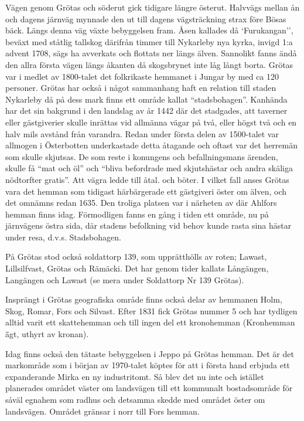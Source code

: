 Vägen genom Grötas och söderut gick tidigare längre österut. Halvvägs mellan ån och dagens järnväg mynnade den ut till dagens vägsträckning strax före Bösas bäck. Längs denna väg växte bebyggelsen fram. Åsen kallades då `Furukangan'', beväxt med ståtlig tallskog därifrån timmer till Nykarleby nya kyrka, invigd 1:a advent 1708, sägs ha avverkats och flottats ner längs älven. Sannolikt fanns ändå den allra första vägen längs åkanten då skogsbrynet inte låg långt borta. Grötas var i medlet av 1800-talet det folkrikaste hemmanet i Jungar by med ca 120 personer. Grötas har också i något sammanhang haft en relation till staden Nykarleby då på dess mark finns ett område kallat ``stadsbohagen''. Kanhända har det sin bakgrund i den landslag av år 1442 där det stadgades, att taverner eller gästgiverier skulle inrättas vid allmänna vägar på två, eller högst två och en halv mils avstånd från varandra. Redan under första delen av 1500-talet var allmogen i Österbotten underkastade detta åtagande och oftast var det herremän som skulle skjutsas. De som reste i konungens och befallningsmans ärenden, skulle få ``mat och öl'' och ``bliva befordrade med skjutshästar och andra skäliga nödtorfter gratis''. Att vägra ledde till åtal. och böter.  I vilket fall anses Grötas vara det hemman som tidigast härbärgerade ett gästgiveri öster om älven, och det omnämns redan 1635. Den troliga platsen var i närheten av där Ahlfors hemman finns idag. Förmodligen fanns en gång i tiden ett område, nu på järnvägens östra sida, där stadens befolkning vid behov kunde rasta sina hästar under resa, d.v.s. Stadsbohagen.

På Grötas stod också soldattorp 139, som upprätthölls av roten; Lawast, Lillsilfvast, Grötas och Rämäcki. Det har genom tider kallats Långängen, Langängen och Lawast (se mera under Soldattorp Nr 139 Grötas).

Insprängt i Grötas geografiska område finns också delar av hemmanen Holm, Skog, Romar, Fors och  Silvast. Efter 1831 fick Grötas nummer 5 och har tydligen alltid varit ett skattehemman och till ingen del ett kronohemman (Kronhemman \= ägt, uthyrt av kronan).

Idag finns också den tätaste bebyggelsen i Jeppo på Grötas hemman. Det är det  markområde som i början av 1970-talet köptes för att i första hand erbjuda ett expanderande Mirka en ny industritomt. Så blev det nu inte och istället planerades området väster om landsvägen till ett kommunalt bostadsområde för såväl egnahem som radhus och detsamma skedde med området öster om landsvägen. Området gränsar i norr till Fors hemman.

